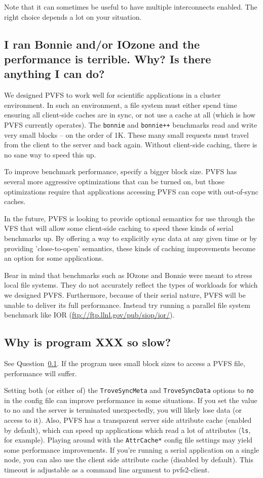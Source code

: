\documentclass[11pt,letterpaper]{article}
\begin{document}
Note that it can sometimes be useful to have multiple interconnects enabled.
The right choice depends a lot on your situation.

\subsection{I ran Bonnie and/or IOzone and the performance is terrible.
Why? Is there anything I can do?}
\label{sec:badperf}

We designed PVFS to work well for scientific applications in a cluster
environment.  In such an environment, a file system must either spend
time ensuring all client-side caches are in sync, or not use a cache
at all (which is how PVFS currently operates).  The \texttt{bonnie}
and \texttt{bonnie++} benchmarks read and write very small blocks --
on the order of 1K.  These many small requests must travel from the
client to the server and back again.  Without client-side caching,
there is no sane way to speed this up.

To improve benchmark performance, specify a bigger block size.   PVFS
has several more aggressive optimizations that can be turned on, but
those optimizations require that applications accessing PVFS can cope
with out-of-sync caches.  

In the future, PVFS is looking to provide optional semantics for use
through the VFS that will allow some client-side caching to speed these
kinds of serial benchmarks up.  By offering a way to explicitly sync
data at any given time or by providing 'close-to-open' semantics, these
kinds of caching improvements become an option for some applications.

Bear in mind that benchmarks such as IOzone and Bonnie were meant to
stress local file systems.   They do not accurately reflect the types of
workloads for which we designed PVFS.  Furthermore, because of their
serial nature, PVFS will be unable to deliver its full performance.
Instead try running a parallel file system benchmark like IOR
(\url{ftp://ftp.llnl.gov/pub/siop/ior/}).


\subsection{Why is program XXX so slow?}
\label{sec:why_so_slow}
See Question~\ref{sec:badperf}.  If the program uses small block sizes to
access a PVFS file, performance will suffer.  

Setting both (or either of) the \texttt{TroveSyncMeta} and
\texttt{TroveSyncData} options to \texttt{no} in the config file can
improve performance in some situations.  If you set the
value to no and the server is terminated unexpectedly, you will likely
lose data (or access to it).  Also, PVFS has a transparent server
side attribute cache (enabled by default), which can speed up
applications which read a lot of attributes (\texttt{ls}, for
example).  Playing around with the \texttt{AttrCache*} config file
settings may yield some performance improvements.  If you're running a
serial application on a single node, you can also use the client side
attribute cache (disabled by default).  This timeout is adjustable as
a command line argument to pvfs2-client.
\end{document}
